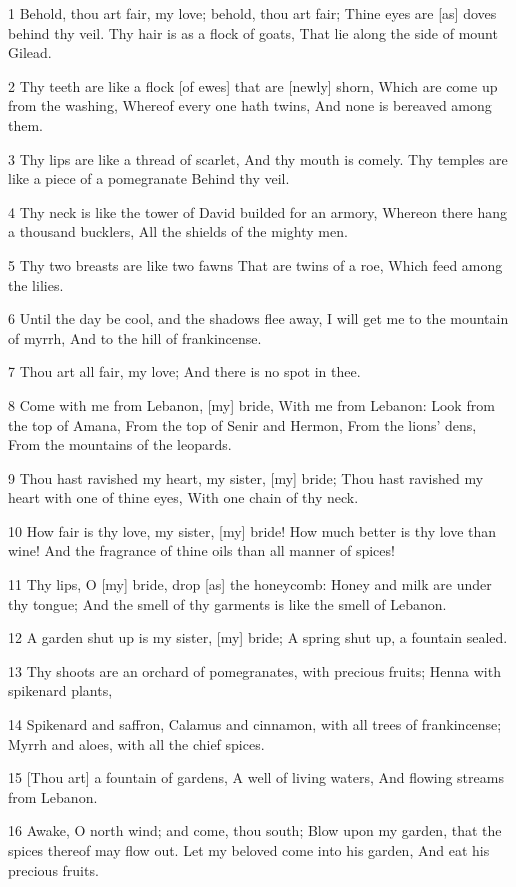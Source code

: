 \par 1 Behold, thou art fair, my love; behold, thou art fair; Thine eyes are [as] doves behind thy veil. Thy hair is as a flock of goats, That lie along the side of mount Gilead.
\par 2 Thy teeth are like a flock [of ewes] that are [newly] shorn, Which are come up from the washing, Whereof every one hath twins, And none is bereaved among them.
\par 3 Thy lips are like a thread of scarlet, And thy mouth is comely. Thy temples are like a piece of a pomegranate Behind thy veil.
\par 4 Thy neck is like the tower of David builded for an armory, Whereon there hang a thousand bucklers, All the shields of the mighty men.
\par 5 Thy two breasts are like two fawns That are twins of a roe, Which feed among the lilies.
\par 6 Until the day be cool, and the shadows flee away, I will get me to the mountain of myrrh, And to the hill of frankincense.
\par 7 Thou art all fair, my love; And there is no spot in thee.
\par 8 Come with me from Lebanon, [my] bride, With me from Lebanon: Look from the top of Amana, From the top of Senir and Hermon, From the lions' dens, From the mountains of the leopards.
\par 9 Thou hast ravished my heart, my sister, [my] bride; Thou hast ravished my heart with one of thine eyes, With one chain of thy neck.
\par 10 How fair is thy love, my sister, [my] bride! How much better is thy love than wine! And the fragrance of thine oils than all manner of spices!
\par 11 Thy lips, O [my] bride, drop [as] the honeycomb: Honey and milk are under thy tongue; And the smell of thy garments is like the smell of Lebanon.
\par 12 A garden shut up is my sister, [my] bride; A spring shut up, a fountain sealed.
\par 13 Thy shoots are an orchard of pomegranates, with precious fruits; Henna with spikenard plants,
\par 14 Spikenard and saffron, Calamus and cinnamon, with all trees of frankincense; Myrrh and aloes, with all the chief spices.
\par 15 [Thou art] a fountain of gardens, A well of living waters, And flowing streams from Lebanon.
\par 16 Awake, O north wind; and come, thou south; Blow upon my garden, that the spices thereof may flow out. Let my beloved come into his garden, And eat his precious fruits.


